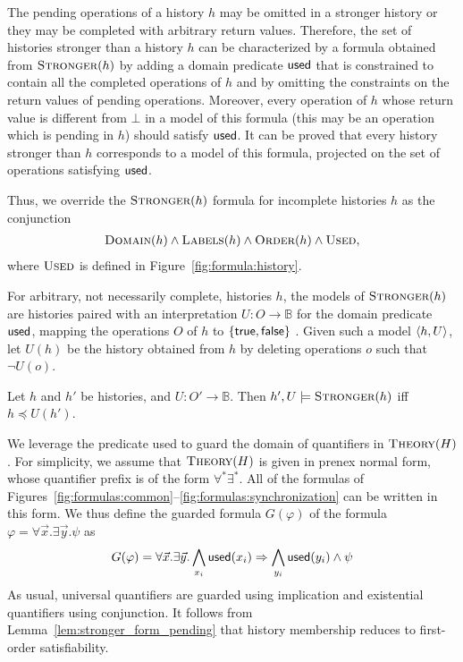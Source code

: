 The pending operations of a history $h$ may be omitted in a stronger history or
they may be completed with arbitrary return values. Therefore, the set of
histories stronger than a history $h$ can be characterized by a formula
obtained from $\textsc{Stronger}(h)$ by adding a domain predicate ${\sf used}$
that is constrained to contain all the completed operations of $h$ and by
omitting the constraints on the return values of pending operations. Moreover,
every operation of $h$ whose return value is different from $\bot$ in a model
of this formula (this may be an operation which is pending in $h$) should
satisfy ${\sf used}$. It can be proved that every history stronger than $h$
corresponds to a model of this formula, projected on the set of operations
satisfying ${\sf used}$.

Thus, we override the $\textsc{Stronger}(h)$ formula for incomplete histories
$h$ as the conjunction
\begin{align*}
  \textsc{Domain}(h) \land \textsc{Labels}(h) \land \textsc{Order}(h) \land \textsc{Used},
\end{align*}
where $\textsc{Used}$ is defined in Figure~\ref{fig:formula:history}.

For arbitrary, not necessarily complete, histories $h$, the models of
$\textsc{Stronger}(h)$ are histories paired with an interpretation $U : O \to
\mathbb{B}$ for the domain predicate ${\sf used}$, mapping the operations $O$ of
$h$ to $\set{\sf true, false}$ . Given such a model $\tup{h,U}$, let $U(h)$ be
the history obtained from $h$ by deleting operations $o$ such that $\lnot U(o)$.

\begin{lemma}
  \label{lem:stronger_form_pending}

  Let $h$ and $h'$ be histories, and $U : O' \to \mathbb{B}$.
  Then $h', U \models \textsc{Stronger}(h)$ if{f} $h \preceq U(h')$.

\end{lemma}

We leverage the predicate {\sf used} to guard the domain of quantifiers in
$\textsc{Theory}(H)$. For simplicity, we assume that $\textsc{Theory}(H)$ is
given in prenex normal form, whose quantifier prefix is of the form $\forall^*
\exists^*$. All of the formulas of
Figures~\ref{fig:formulas:common}--\ref{fig:formulas:synchronization} can be
written in this form. We thus define the guarded formula $G(\varphi)$ of the formula
$\varphi = \forall \vec{x}. \exists \vec{y}. \psi$ as
\begin{align*}
  G(\varphi) = \forall \vec{x}. \exists \vec{y}.
  \bigwedge_{x_i} {\sf used}(x_i) \implies 
  \bigwedge_{y_i} {\sf used}(y_i) \land \psi
\end{align*}
As usual, universal quantifiers are guarded using implication and existential
quantifiers using conjunction. It follows from
Lemma~\ref{lem:stronger_form_pending} that history membership reduces to
first-order satisfiability.

